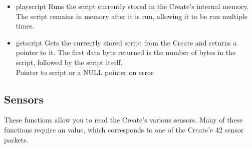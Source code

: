 \documentclass {article}
\begin{document}
\begin {itemize}
  \item {} {playscript}
         Runs the script currently stored in the Create's internal memory.  The script remains in
         memory after it is run, allowing it to be run multiple times. \\
         \retnorm

  \item {} {getscript}
         Gets the currently stored script from the Create and returns a pointer to it.  The first
         data byte returned is the number of bytes in the script, followed by the script itself. \\
         \ret Pointer to script or a NULL pointer on error  
\end {itemize}

\subsection {Sensors}
These functions allow you to read the Create's various sensors.  Many of these functions require an
\oisensor value, which corresponds to one of the Create'e 42 sensor packets.
\end{document}
